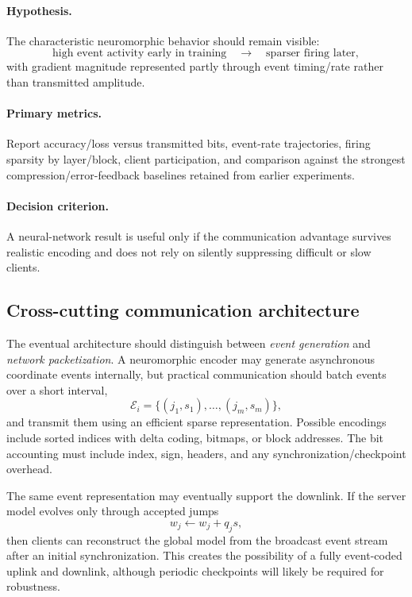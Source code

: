 \paragraph{Hypothesis.}
The characteristic neuromorphic behavior should remain visible:
\begin{equation}
  \text{high event activity early in training}\quad\rightarrow\quad\text{sparser firing later},
\end{equation}
with gradient magnitude represented partly through event timing/rate rather than transmitted amplitude.

\paragraph{Primary metrics.}
Report accuracy/loss versus transmitted bits, event-rate trajectories, firing sparsity by layer/block, client participation, and comparison against the strongest compression/error-feedback baselines retained from earlier experiments.

\paragraph{Decision criterion.}
A neural-network result is useful only if the communication advantage survives realistic encoding and does not rely on silently suppressing difficult or slow clients.

\subsection{Cross-cutting communication architecture}

The eventual architecture should distinguish between \emph{event generation} and \emph{network packetization}. A neuromorphic encoder may generate asynchronous coordinate events internally, but practical communication should batch events over a short interval,
\begin{equation}
  \mathcal{E}_i=\{(j_1,s_1),\ldots,(j_m,s_m)\},
\end{equation}
and transmit them using an efficient sparse representation. Possible encodings include sorted indices with delta coding, bitmaps, or block addresses. The bit accounting must include index, sign, headers, and any synchronization/checkpoint overhead.

The same event representation may eventually support the downlink. If the server model evolves only through accepted jumps
\begin{equation}
  w_j\leftarrow w_j+q_js,
\end{equation}
then clients can reconstruct the global model from the broadcast event stream after an initial synchronization. This creates the possibility of a fully event-coded uplink and downlink, although periodic checkpoints will likely be required for robustness.

